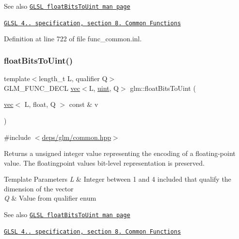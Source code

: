 \begin{DoxySeeAlso}{See also}
\href{http://www.opengl.org/sdk/docs/manglsl/xhtml/floatBitsToUint.xml}{\tt G\+L\+SL float\+Bits\+To\+Uint man page} 

\href{http://www.opengl.org/registry/doc/GLSLangSpec.4.20.8.pdf}{\tt G\+L\+SL 4.. specification, section 8. Common Functions} 
\end{DoxySeeAlso}


Definition at line 722 of file func\+\_\+common.\+inl.

\mbox{\label{group__core__func__common_ga49418ba4c8a60fbbb5d57b705f3e26db}} 
\subsubsection{\texorpdfstring{float\+Bits\+To\+Uint()}{floatBitsToUint()}\hspace{0.1cm}{\footnotesize\ttfamily [2/2]}}
{\footnotesize\ttfamily template$<$length\+\_\+t L, qualifier Q$>$ \\
G\+L\+M\+\_\+\+F\+U\+N\+C\+\_\+\+D\+E\+CL \hyperlink{structglm_1_1vec}{vec}$<$L, \hyperlink{group__core__precision_ga4fd29415871152bfb5abd588334147c8}{uint}, Q$>$ glm\+::float\+Bits\+To\+Uint (\begin{DoxyParamCaption}\item[{\hyperlink{structglm_1_1vec}{vec}$<$ L, float, Q $>$ const \&}]{v }\end{DoxyParamCaption})}



{\ttfamily \#include $<$\hyperlink{common_8hpp}{deps/glm/common.\+hpp}$>$}

Returns a unsigned integer value representing the encoding of a floating-\/point value. The floatingpoint value\textquotesingle{}s bit-\/level representation is preserved.


\begin{DoxyTemplParams}{Template Parameters}
{\em L} & Integer between 1 and 4 included that qualify the dimension of the vector \\
\hline
{\em Q} & Value from qualifier enum\\
\hline
\end{DoxyTemplParams}
\begin{DoxySeeAlso}{See also}
\href{http://www.opengl.org/sdk/docs/manglsl/xhtml/floatBitsToUint.xml}{\tt G\+L\+SL float\+Bits\+To\+Uint man page} 

\href{http://www.opengl.org/registry/doc/GLSLangSpec.4.20.8.pdf}{\tt G\+L\+SL 4.. specification, section 8. Common Functions} 
\end{DoxySeeAlso}



